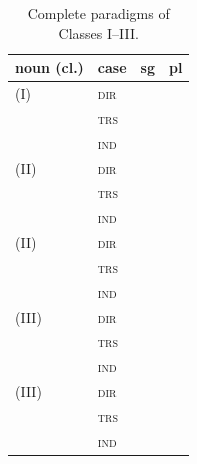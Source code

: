 \begin{table}[ht]
  \footnotesize
  \caption{Complete paradigms of Classes I--III.}
  \ifparadigmappendix\else\label{tab:nm-plural-paradigm}\fi
  \ifparadigmappendix\else\label{tab:nm-stem-selection}\fi
  \begin{tabularx}{\textwidth}{l l L L}
    \toprule
    {\sc noun (cl.)} & {\sc case} & {\sc sg} & {\sc pl} \\
    \midrule
     (I) & \textsc{dir} &  &  \\
     & \textsc{trs} &  &  \\
     & \textsc{ind} &  &  \\
    \addlinespace
     (II) & \textsc{dir} &  &  \\
     & \textsc{trs} &  &  \\
     & \textsc{ind} &  &  \\
    \addlinespace
     (II) & \textsc{dir} &  &  \\
     & \textsc{trs} &  &  \\
     & \textsc{ind} &  &  \\
    \addlinespace
     (III) & \textsc{dir} &  &  \\
     & \textsc{trs} &  &  \\
     & \textsc{ind} &  &  \\
    \addlinespace
     (III) & \textsc{dir} &  &  \\
     & \textsc{trs} &  &  \\
     & \textsc{ind} &  &  \\
    \bottomrule
  \end{tabularx}
\end{table}
